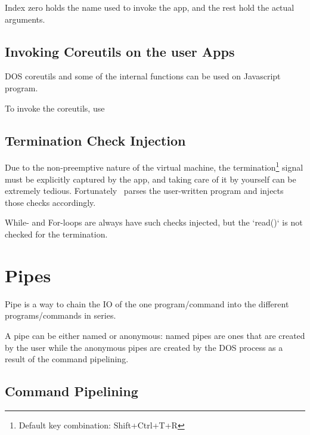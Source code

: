 Index zero holds the name used to invoke the app, and the rest hold the actual arguments.


\section{Invoking Coreutils on the user Apps}

DOS coreutils and some of the internal functions can be used on Javascript program.

To invoke the coreutils, use 

\begin{outline}
\1
\1
\1
\1
\end{outline}


\section{Termination Check Injection}

Due to the non-preemptive nature of the virtual machine, the termination\footnote{Default key combination: Shift+Ctrl+T+R} signal must be explicitly captured by the app, and taking care of it by yourself can be extremely tedious. Fortunately \thedos\ parses the user-written program and injects those checks accordingly.

While- and For-loops are always have such checks injected, but the `read()` is not checked for the termination.


\chapter{Pipes}

Pipe is a way to chain the IO of the one program/command into the different programs/commands in series.

A pipe can be either named or anonymous: named pipes are ones that are created by the user while the anonymous pipes are created by the DOS process as a result of the command pipelining.

\section{Command Pipelining}

